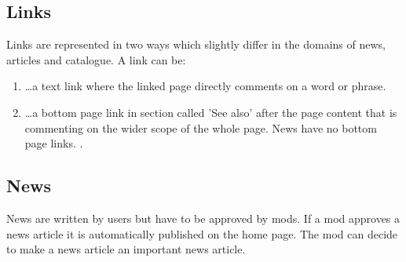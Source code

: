 \subsection{Links}
\begin{tcolorbox}[breakable,colback=red!14,colframe=red!40!black,title=UPDATE 19/11/2017]
Links are represented in two ways which slightly differ in the domains of news, articles and catalogue.
A link can be:
\begin{enumerate}
    \item \ldots a text link where the linked page directly comments on a word or phrase.

    \item \ldots a bottom page link in section called 'See also' after the page content that is commenting on the wider scope of the whole page. 
        News have no bottom page links.
        .
\end{enumerate}
\end{tcolorbox}

\subsection{News}
News are written by users but have to be approved by mods.
If a mod approves a news article it is automatically published on the home page.
The mod can decide to make a news article an important news article.

